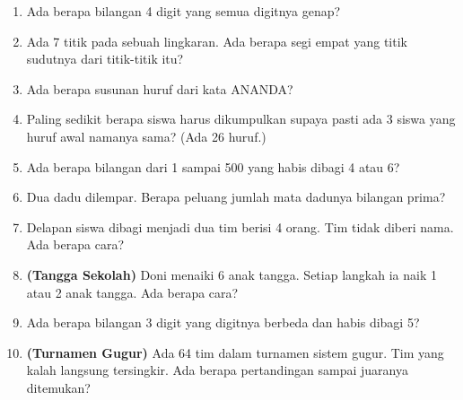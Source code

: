 \documentclass[11pt,a4paper]{article}
\begin{document}
\begin{enumerate}
  \item Ada berapa bilangan 4 digit yang semua digitnya genap?
  \item Ada 7 titik pada sebuah lingkaran. Ada berapa segi empat yang titik sudutnya dari
        titik-titik itu?
  \item Ada berapa susunan huruf dari kata ANANDA?
  \item Paling sedikit berapa siswa harus dikumpulkan supaya pasti ada 3 siswa yang huruf awal
        namanya sama? (Ada 26 huruf.)
  \item Ada berapa bilangan dari 1 sampai 500 yang habis dibagi 4 atau 6?
  \item Dua dadu dilempar. Berapa peluang jumlah mata dadunya bilangan prima?
  \item Delapan siswa dibagi menjadi dua tim berisi 4 orang. Tim tidak diberi nama.
        Ada berapa cara?
  \item \textbf{(Tangga Sekolah)} Doni menaiki 6 anak tangga. Setiap langkah ia naik 1 atau 2 anak
        tangga. Ada berapa cara?
  \item Ada berapa bilangan 3 digit yang digitnya berbeda dan habis dibagi 5?
  \item \textbf{(Turnamen Gugur)} Ada 64 tim dalam turnamen sistem gugur. Tim yang kalah langsung
        tersingkir. Ada berapa pertandingan sampai juaranya ditemukan?
\end{enumerate}
\end{document}
